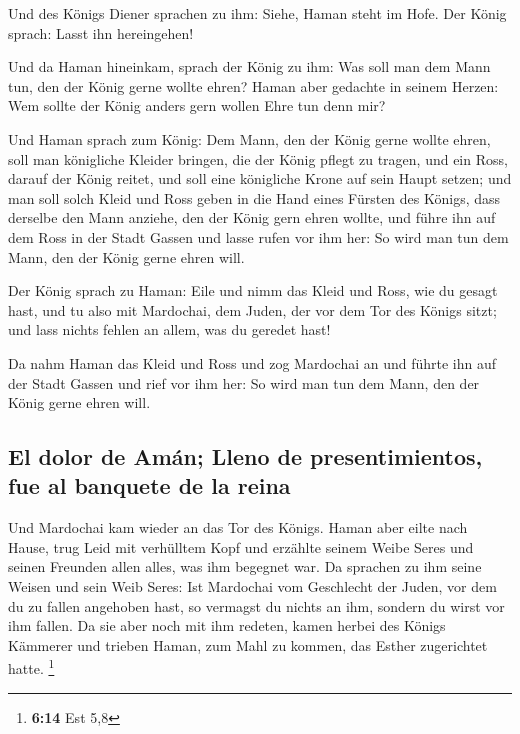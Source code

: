  Und des Königs Diener sprachen zu ihm: Siehe, Haman steht
im Hofe. Der König sprach: Lasst ihn hereingehen!

 Und da Haman hineinkam, sprach der König zu ihm: Was soll
man dem Mann tun, den der König gerne wollte ehren? Haman aber gedachte
in seinem Herzen: Wem sollte der König anders gern wollen Ehre tun denn
mir?

 Und Haman sprach zum König: Dem Mann, den der König gerne
wollte ehren,  soll man königliche Kleider bringen, die
der König pflegt zu tragen, und ein Ross, darauf der König reitet, und
soll eine königliche Krone auf sein Haupt setzen;  und man
soll solch Kleid und Ross geben in die Hand eines Fürsten des Königs,
dass derselbe den Mann anziehe, den der König gern ehren wollte, und
führe ihn auf dem Ross in der Stadt Gassen und lasse rufen vor ihm her:
So wird man tun dem Mann, den der König gerne ehren will.

 Der König sprach zu Haman: Eile und nimm das Kleid und
Ross, wie du gesagt hast, und tu also mit Mardochai, dem Juden, der vor
dem Tor des Königs sitzt; und lass nichts fehlen an allem, was du
geredet hast!

 Da nahm Haman das Kleid und Ross und zog Mardochai an
und führte ihn auf der Stadt Gassen und rief vor ihm her: So wird man
tun dem Mann, den der König gerne ehren will.

\hypertarget{el-dolor-de-amuxe1n-lleno-de-presentimientos-fue-al-banquete-de-la-reina}{%
\subsection{El dolor de Amán; Lleno de presentimientos, fue al banquete
de la
reina}\label{el-dolor-de-amuxe1n-lleno-de-presentimientos-fue-al-banquete-de-la-reina}}

 Und Mardochai kam wieder an das Tor des Königs. Haman
aber eilte nach Hause, trug Leid mit verhülltem Kopf  und
erzählte seinem Weibe Seres und seinen Freunden allen alles, was ihm
begegnet war. Da sprachen zu ihm seine Weisen und sein Weib Seres: Ist
Mardochai vom Geschlecht der Juden, vor dem du zu fallen angehoben hast,
so vermagst du nichts an ihm, sondern du wirst vor ihm fallen.
 Da sie aber noch mit ihm redeten, kamen herbei des
Königs Kämmerer und trieben Haman, zum Mahl zu kommen, das Esther
zugerichtet hatte. \footnote{\textbf{6:14} Est 5,8}

